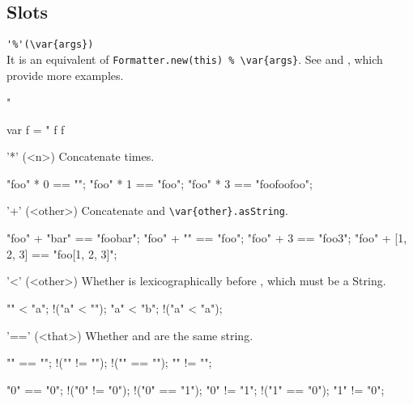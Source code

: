 \subsection{Slots}
\begin{urbiscriptapi}
\item \lstinline|'%'(\var{args})|\\
  It is an equivalent of \lstinline|Formatter.new(this) % \var{args}|.
  See  and , which provide more
  examples.
\begin{urbiassert}
"%

var f = "%
f %
f %
\end{urbiassert}


\item['*'](<n>)%
  Concatenate \this {} times.
\begin{urbiassert}
"foo" * 0 == "";
"foo" * 1 == "foo";
"foo" * 3 == "foofoofoo";
\end{urbiassert}


\item['+'](<other>)%
  Concatenate \this and \lstinline|\var{other}.asString|.
\begin{urbiassert}
"foo" + "bar" == "foobar";
"foo" + "" == "foo";
"foo" + 3 == "foo3";
"foo" + [1, 2, 3] == "foo[1, 2, 3]";
\end{urbiassert}


\item['<'](<other>)%
  Whether \this is lexicographically before ,
  which must be a String.
\begin{urbiassert}
"" < "a";
!("a" < "");
"a" < "b";
!("a" < "a");
\end{urbiassert}


\item['=='](<that>)%
  Whether \this and  are the same string.
\begin{urbiassert}
  "" == "";        !("" != "");
!("" == "\0");       "" != "\0";

  "0" == "0";      !("0" != "0");
!("0" == "1");       "0" != "1";
!("1" == "0");       "1" != "0";
\end{urbiassert}



\end{urbiscriptapi}
